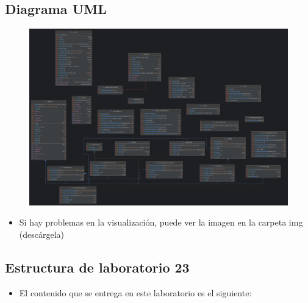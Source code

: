 \documentclass{article}
\begin{document}
	
	
	\subsection{Diagrama UML}
	
	\begin{figure}[H]
		\centering
		\includegraphics[width=1\textwidth,keepaspectratio]{img/uml.png}
	\end{figure}
	
	\begin{itemize}	
			\item Si hay problemas en la visualización, puede ver la imagen en la carpeta img (descárgela)
	\end{itemize}
	
	
	
	
	
	\subsection{Estructura de laboratorio 23}
	\begin{itemize}	
		\item El contenido que se entrega en este laboratorio es el siguiente:
	\end{itemize}
	
\end{document}
